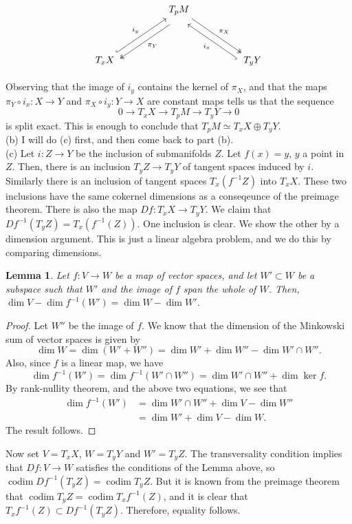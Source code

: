\documentclass{amsart}
\numberwithin{equation}{section}
\theoremstyle{plain}
\newtheorem{lemma}[theorem]{Lemma}
\theoremstyle{definition}
\theoremstyle{remark}
\newcommand{\osum}{\oplus}
\renewcommand{\_}[2]{\underbrace{#1}_{#2}}
\renewcommand{\^}[2]{\overbrace{#1}_{#2}}
\newcommand{\codim}{\operatorname{codim}}
\begin{document}
 \[\begin{tikzcd}
	&& {T_pM} \\
	\\
	{T_xX} &&&& {T_yY}
	\arrow["{\pi_Y}", shift left=3, two heads, from=1-3, to=3-1]
	\arrow["{\pi_X}", two heads, from=1-3, to=3-5]
	\arrow["{i_y}", hook, from=3-1, to=1-3]
	\arrow["{i_x}", shift left=3, hook, from=3-5, to=1-3]
 \end{tikzcd}\]

 Observing that the image of $i_y$ contains the kernel of $\pi_X$, and that the maps $\pi_Y \circ i_x: X\to Y$ and $\pi_X \circ i_y:Y \to X$ are constant maps tells us that the sequence \[0\to T_xX \to T_pM \to T_yY \to 0\] is split exact. This is enough to conclude that $T_pM \simeq T_xX \osum T_yY$.\\

 (b) I will do (c) first, and then come back to part (b).\\

 (c) Let $i:Z\to Y$ be the inclusion of submanifolds $Z$. Let $f(x) = y$, $y$ a point in $Z$. Then, there is an inclusion $T_yZ \to T_yY$ of tangent spaces induced by $i$. Similarly there is an inclusion of tangent spaces $T_x(f^{-1}Z)$ into $T_xX$. These two inclusions have the same cokernel dimensions as a conseqeunce of the preimage theorem. There is also the map $Df: T_xX \to T_yY$. We claim that $Df^{-1}(T_yZ) = T_x(f^{-1}(Z))$. One inclusion is clear. We show the other by a dimension argument. This is just a linear algebra problem, and we do this by comparing dimensions.
 \begin{lemma}
   Let $f: V \to W$ be a map of vector spaces, and let $W' \subset W$ be a subspace such that $W'$ and the image of $f$ span the whole of $W$. Then, $\dim V - \dim f^{-1}(W') = \dim W - \dim W'$. 
 \end{lemma}
 \begin{proof}
   Let $W''$ be the image of $f$. We know that the dimension of the Minkowski sum of vector spaces is given by \[\dim W = \dim (W'+W'') = \dim W' + \dim W'' - \dim W'\cap W''.\] Also, since $f$ is a linear map, we have \[\dim f^{-1}(W') = \dim f^{-1}(W'\cap W'') = \dim W'\cap W'' + \dim \ker f.\]
   By rank-nullity theorem, and the above two equations, we see that
   \begin{align*}
     \dim f^{-1}(W') & = \dim W'\cap W'' + \dim V - \dim W''\\
                     & = \dim W' + \dim V - \dim W.                       
   \end{align*}
   The result follows.
 \end{proof}
 Now set $V = T_xX$, $W = T_yY$ and $W' = T_yZ$. The transversality condition implies that $Df: V \to W$ satisfies the conditions of the Lemma above, so $\codim Df^{-1}(T_yZ) = \codim T_yZ$. But it is known from the preimage theorem that $\codim T_yZ = \codim T_xf^{-1}(Z)$, and it is clear that $T_xf^{-1}(Z) \subset Df^{-1}(T_yZ)$. Therefore, equality follows.\\
\end{document}
